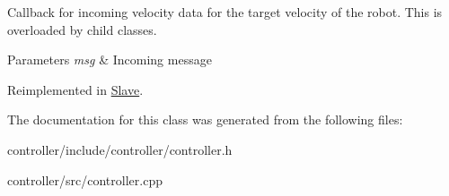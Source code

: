 Callback for incoming velocity data for the target velocity of the robot. This is overloaded by child classes. 


\begin{DoxyParams}{Parameters}
{\em msg} & Incoming message \\
\hline
\end{DoxyParams}


Reimplemented in \hyperlink{classSlave_a2227f30ab058b623de7f6a940d079c90}{Slave}.



The documentation for this class was generated from the following files\+:\begin{DoxyCompactItemize}
\item 
controller/include/controller/controller.\+h\item 
controller/src/controller.\+cpp\end{DoxyCompactItemize}
